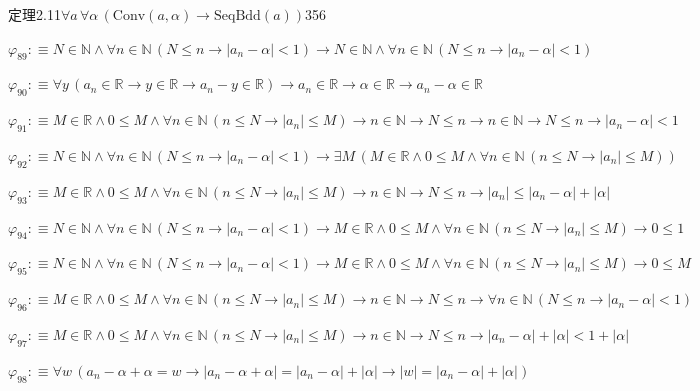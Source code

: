 \begin{fullproof}{定理2.11}{$\forall a\,\forall \alpha\,(\mathrm{Conv}(a,\alpha) \to \mathrm{SeqBdd}(a))$}{356}
\begin{abbrevlist}
\item $\varphi_{89} :\equiv N \in \mathbb{N} \land \forall n \in \mathbb{N}\,(N \leq n \to \lvert a_{n} - \alpha \rvert < 1) \to N \in \mathbb{N} \land \forall n \in \mathbb{N}\,(N \leq n \to \lvert a_{n} - \alpha \rvert < 1)$
\item $\varphi_{90} :\equiv \forall y\,(a_{n} \in \mathbb{R} \to y \in \mathbb{R} \to a_{n} - y \in \mathbb{R}) \to a_{n} \in \mathbb{R} \to \alpha \in \mathbb{R} \to a_{n} - \alpha \in \mathbb{R}$
\item $\varphi_{91} :\equiv M \in \mathbb{R} \land 0 \leq M \land \forall n \in \mathbb{N}\,(n \leq N \to \lvert a_{n} \rvert \leq M) \to n \in \mathbb{N} \to N \leq n \to n \in \mathbb{N} \to N \leq n \to \lvert a_{n} - \alpha \rvert < 1$
\item $\varphi_{92} :\equiv N \in \mathbb{N} \land \forall n \in \mathbb{N}\,(N \leq n \to \lvert a_{n} - \alpha \rvert < 1) \to \exists M\,(M \in \mathbb{R} \land 0 \leq M \land \forall n \in \mathbb{N}\,(n \leq N \to \lvert a_{n} \rvert \leq M))$
\item $\varphi_{93} :\equiv M \in \mathbb{R} \land 0 \leq M \land \forall n \in \mathbb{N}\,(n \leq N \to \lvert a_{n} \rvert \leq M) \to n \in \mathbb{N} \to N \leq n \to \lvert a_{n} \rvert \leq \lvert a_{n} - \alpha \rvert + \lvert \alpha \rvert$
\item $\varphi_{94} :\equiv N \in \mathbb{N} \land \forall n \in \mathbb{N}\,(N \leq n \to \lvert a_{n} - \alpha \rvert < 1) \to M \in \mathbb{R} \land 0 \leq M \land \forall n \in \mathbb{N}\,(n \leq N \to \lvert a_{n} \rvert \leq M) \to 0 \leq 1$
\item $\varphi_{95} :\equiv N \in \mathbb{N} \land \forall n \in \mathbb{N}\,(N \leq n \to \lvert a_{n} - \alpha \rvert < 1) \to M \in \mathbb{R} \land 0 \leq M \land \forall n \in \mathbb{N}\,(n \leq N \to \lvert a_{n} \rvert \leq M) \to 0 \leq M$
\item $\varphi_{96} :\equiv M \in \mathbb{R} \land 0 \leq M \land \forall n \in \mathbb{N}\,(n \leq N \to \lvert a_{n} \rvert \leq M) \to n \in \mathbb{N} \to N \leq n \to \forall n \in \mathbb{N}\,(N \leq n \to \lvert a_{n} - \alpha \rvert < 1)$
\item $\varphi_{97} :\equiv M \in \mathbb{R} \land 0 \leq M \land \forall n \in \mathbb{N}\,(n \leq N \to \lvert a_{n} \rvert \leq M) \to n \in \mathbb{N} \to N \leq n \to \lvert a_{n} - \alpha \rvert + \lvert \alpha \rvert < 1 + \lvert \alpha \rvert$
\item $\varphi_{98} :\equiv \forall w\,(a_{n} - \alpha + \alpha = w \to \lvert a_{n} - \alpha + \alpha \rvert = \lvert a_{n} - \alpha \rvert + \lvert \alpha \rvert \to \lvert w \rvert = \lvert a_{n} - \alpha \rvert + \lvert \alpha \rvert)$

\end{abbrevlist}
\end{fullproof}
